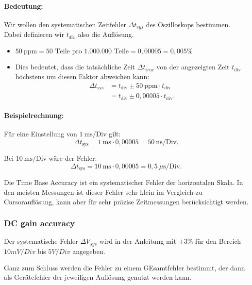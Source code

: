 \paragraph{Bedeutung:} 

Wir wollen den systematischen Zeitfehler $\Delta t_{sys}$ des Oszilloskops bestimmen. Dabei definieren wir $t_{div}$ also die Auflösung.

\begin{itemize}
    \item \(50~\text{ppm} = 50 \text{ Teile pro 1.000.000 Teile} = 0,00005 = 0,005\%\)
    \item Dies bedeutet, dass die tatsächliche Zeit \(\Delta t_\text{true}\) von der angezeigten Zeit \(t_\text{div}\) höchstens um diesen Faktor abweichen kann:
    \begin{align}
        \Delta t_\text{sys} &=t_\text{div} \pm 50~\text{ppm} \cdot t_\text{div} \\
        &=t_\text{div} \pm 0,00005 \cdot t_\text{div}.
    \end{align}
\end{itemize}

\paragraph{Beispielrechnung:} Für eine Einstellung von \(1~\text{ms/Div}\) gilt:
\begin{equation}
    \Delta t_\text{sys}
    = 1~\text{ms} \cdot 0,00005
    = 50~\text{ns/Div}.
\end{equation}

Bei \(10~\text{ms/Div}\) wäre der Fehler:
\begin{equation}
\Delta t_\text{sys} = 10~\text{ms} \cdot 0,00005 = 0,5~\mu\text{s/Div}.
\end{equation}

Die Time Base Accuracy ist ein systematischer Fehler der horizontalen Skala. In den meisten Messungen ist dieser Fehler sehr klein im Vergleich zu Cursorauflösung, kann aber für sehr präzise Zeitmessungen berücksichtigt werden.

\subsubsection*{DC gain accuracy}
Der systematische Fehler $\Delta V_{sys}$ wird in der Anleitung mit $\pm 3\%$ für den Bereich $10mV/Div$ bis $5V/Div$ angegeben. 

Ganz zum Schluss werden die Fehler zu einem GEsamtfehler bestimmt, der dann als Gerätefehler der jeweiligen Auflösung genutzt werden kann.


